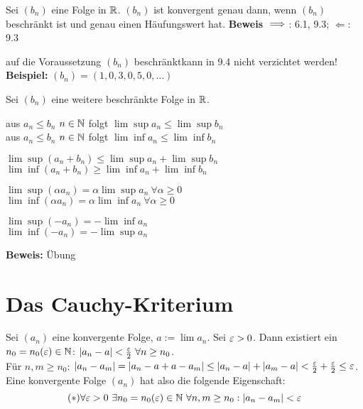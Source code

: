 \documentclass[a4paper,oneside,DIV15,BCOR12mm]{scrbook}
\begin{document}
\begin{folgerung}
Sei $(b_n)$ eine Folge in $\mathbb{R}$. $(b_n)$ ist konvergent genau dann, wenn $(b_n)$ beschränkt ist und genau einen Häufungswert hat.
\textbf{Beweis}
\glqq$\implies$\grqq: 6.1, 9.3; \glqq$\Leftarrow$\grqq: 9.3
\end{folgerung}

\begin{beispiel}
auf die Voraussetzung \glqq$(b_n)$ beschränkt\grqq kann in 9.4 nicht verzichtet werden!\\
\textbf{Beispiel:} $(b_n)=(1,0,3,0,5,0,\ldots)$
\end{beispiel}

\begin{satz}
Sei $(b_n)$ eine weitere beschränkte Folge  in $\mathbb{R}$.
\begin{liste}
\item aus $a_n \le b_n$ \ffa $ n\in\mathbb{N}$ folgt $\lim\sup a_n \le \lim\sup b_n$ \\
aus $a_n \le b_n$ \ffa $ n\in\mathbb{N}$ folgt $\lim\inf a_n \le \lim\inf b_n$
\item $\lim\sup(a_n + b_n) \le \lim\sup a_n + \lim\sup b_n$ \\
$\lim\inf(a_n + b_n) \ge \lim\inf a_n + \lim\inf b_n$
\item $\lim\sup(\alpha a_n) = \alpha\lim\sup a_n \ \forall \alpha \ge 0$\\
$\lim\inf(\alpha a_n) = \alpha\lim\inf a_n \ \forall \alpha \ge 0$
\item $\lim\sup(- a_n) = -\lim\inf a_n$\\
$\lim\inf(- a_n) = -\lim\sup a_n$

\end{liste}
\end{satz}

\textbf{Beweis:} Übung

\chapter{Das Cauchy-Kriterium}

\begin{motivation}
Sei $(a_n)$ eine konvergente Folge, $a:= \lim a_n$. Sei $\varepsilon >0$. Dann existiert ein $n_0 = n_0(\varepsilon) \in \mathbb{N}$: $|a_n - a| < \frac{\varepsilon}{2} \ \forall n \ge n_0$.\\
Für $n,m\ge n_0$: $|a_n - a_m| = |a_n - a + a - a_m| \le |a_n -a| + |a_m -a| < \frac{\varepsilon}{2} + \frac{\varepsilon}{2} \le \varepsilon$.\\
Eine konvergente Folge $(a_n)$ hat also die folgende Eigenschaft:
$$(*) \forall \varepsilon > 0 \ \exists n_0 = n_0(\varepsilon) \in \mathbb{N} \ \forall n,m \ge n_0: |a_n-a_m| < \varepsilon$$
\end{motivation}
\end{document}
